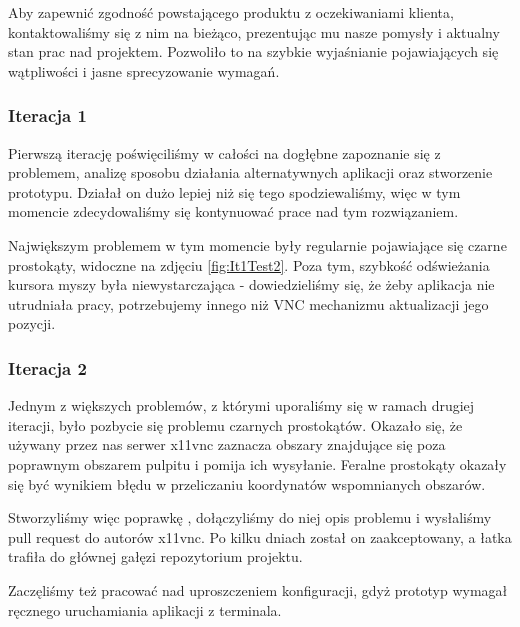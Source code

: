    Aby zapewnić zgodność powstającego produktu z oczekiwaniami klienta, kontaktowaliśmy się z nim na bieżąco, prezentując mu nasze pomysły i aktualny stan prac nad projektem. Pozwoliło to na szybkie wyjaśnianie pojawiających się wątpliwości i jasne sprecyzowanie wymagań.

    \subsubsection{Iteracja 1}

      Pierwszą iterację poświęciliśmy w całości na dogłębne zapoznanie się z problemem, analizę sposobu działania alternatywnych aplikacji oraz stworzenie prototypu. Działał on dużo lepiej niż się tego spodziewaliśmy, więc w tym momencie zdecydowaliśmy się kontynuować prace nad tym rozwiązaniem.

      Największym problemem w tym momencie były regularnie pojawiające się czarne prostokąty, widoczne na zdjęciu \ref{fig:It1Test2}. Poza tym, szybkość odświeżania kursora myszy była niewystarczająca - dowiedzieliśmy się, że żeby aplikacja nie utrudniała pracy, potrzebujemy innego niż VNC mechanizmu aktualizacji jego pozycji.


    \subsubsection{Iteracja 2}

      \label{sec:x11vncBug}
      Jednym z większych problemów, z którymi uporaliśmy się w ramach drugiej iteracji, było pozbycie się problemu czarnych prostokątów. Okazało się, że używany przez nas serwer x11vnc zaznacza obszary znajdujące się poza poprawnym obszarem pulpitu i pomija ich wysyłanie. Feralne prostokąty okazały się być wynikiem błędu w przeliczaniu koordynatów wspomnianych obszarów.

      Stworzyliśmy więc poprawkę \cite{x11vncPatch}, dołączyliśmy do niej opis problemu i wysłaliśmy pull request \cite{x11vncPullRequest} do autorów x11vnc. Po kilku dniach został on zaakceptowany, a łatka trafiła do głównej gałęzi repozytorium projektu.


      Zaczęliśmy też pracować nad uproszczeniem konfiguracji, gdyż prototyp wymagał ręcznego uruchamiania aplikacji z terminala.

